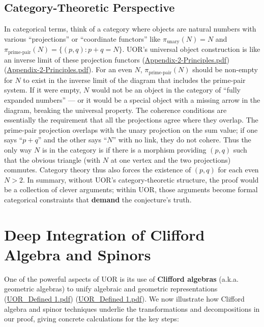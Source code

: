\documentclass[12pt]{article}
\begin{document}
\subsection{Category-Theoretic Perspective}
In categorical terms, think of a category where objects are natural numbers with various ``projections'' or ``coordinate functors'' like $\pi_{\text{unary}}(N)=N$ and $\pi_{\text{prime-pair}}(N) = \{(p,q):p+q=N\}$. UOR’s universal object construction is like an inverse limit of these projection functors (\href{file://file-TfNUqeKofDhk2Y2hbijWtk#:~:text=each%20such%20family%20truly%20represents,what%20should%20be%20the%20same}{Appendix-2-Principles.pdf}) (\href{file://file-TfNUqeKofDhk2Y2hbijWtk#:~:text=inverse%20limit%20,2}{Appendix-2-Principles.pdf}). For an even $N$, $\pi_{\text{prime-pair}}(N)$ should be non-empty for $N$ to exist in the inverse limit of the diagram that includes the prime-pair system. If it were empty, $N$ would not be an object in the category of ``fully expanded numbers'' --- or it would be a special object with a missing arrow in the diagram, breaking the universal property. The coherence conditions are essentially the requirement that all the projections agree where they overlap. The prime-pair projection overlaps with the unary projection on the sum value; if one says ``$p+q$'' and the other says ``$N$'' with no link, they do not cohere. Thus the only way $N$ is in the category is if there is a morphism providing $(p,q)$ such that the obvious triangle (with $N$ at one vertex and the two projections) commutes. Category theory thus also forces the existence of $(p,q)$ for each even $N>2$. In summary, without UOR’s category-theoretic structure, the proof would be a collection of clever arguments; within UOR, those arguments become formal categorical constraints that \textbf{demand} the conjecture’s truth.

\section{Deep Integration of Clifford Algebra and Spinors}
One of the powerful aspects of UOR is its use of \textbf{Clifford algebras} (a.k.a. geometric algebras) to unify algebraic and geometric representations (\href{file://file-Rasc2uW2LQtFGLmNLDMJzD#:~:text=structure%20that%20integrates%20geometric%20algebra%2C,on%20three%20primary%20mathematical%20foundations}{UOR\_Defined 1.pdf}) (\href{file://file-Rasc2uW2LQtFGLmNLDMJzD#:~:text=Clifford%20Algebras%3A%20Let%20%24V%24%20be,R%7D%5Coplus%20V%20%5Coplus%20%28V%5Cotimes}{UOR\_Defined 1.pdf}). We now illustrate how Clifford algebra and spinor techniques underlie the transformations and decompositions in our proof, giving concrete calculations for the key steps:
\end{document}
